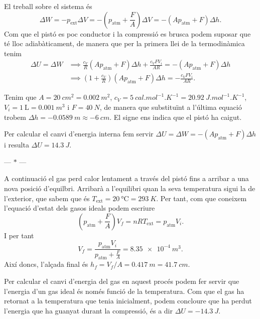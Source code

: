 \documentclass[12pt]{article}
\newcommand{\parbreak}{
	\begin{center}
		--- $\ast$ ---
	\end{center} 
}
\begin{document}
El treball sobre el sistema és
\begin{equation*}
	\Delta W = - p_{\text{ext}} \Delta V = -\left(p_{\text{atm}} + \frac{F}{A}\right) \Delta V = -(Ap_{\text{atm}} + F) \Delta h.
\end{equation*}
Com que el pistó es poc conductor i la compressió es brusca podem suposar que té lloc adiabàticament, de manera que per la primera llei de la termodinàmica tenim
\begin{align*}
	\Delta U = \Delta W & \implies \frac{c_V}{R} (A p_{\text{atm}} + F) \Delta h + \frac{c_V F V_i}{AR} = -(Ap_{\text{atm}} + F) \Delta h \\
											& \implies \left(1 + \frac{c_V}{R}\right) \left(A p_{\text{atm}} + F \right) \Delta h = -\frac{c_V F V_i}{AR}. 
\end{align*}

Tenim que \( A = \SI{20}{cm^2} = \SI{0.002}{m^2} \), \( c_V = \SI{5}{cal.mol^{-1}.K^{-1}} = \SI{20.92}{J.mol^{-1}.K^{-1}} \), \( V_i = \SI{1}{\liter} = \SI{0.001}{m^3} \) i \( F = \SI{40}{N} \), de manera que substituïnt a l'última equació trobem \( \Delta h = \SI{-0.0589}{m} \approx \SI{-6}{cm} \). El signe ens indica que el pistó ha caigut. 

Per calcular el canvi d'energia interna fem servir \( \Delta U = \Delta W = -(Ap_{\text{atm}} + F) \Delta h \) i resulta \( \Delta U = \SI{14.3}{J} \).

\parbreak

A continuació el gas perd calor lentament a través del pistó fins a arribar a una nova posició d'equilbri. Arribarà a l'equilibri quan la seva temperatura sigui la de l'exterior, que sabem que és \( T_{\text{ext}} = \SI{20}{\celsius} = \SI{293}{K} \). Per tant, com que coneixem l'equació d'estat dels gasos ideals podem escriure
\begin{equation*}
	\left(p_{\text{atm}} + \frac{F}{A}\right) V_f = nRT_{\text{ext}} = p_{\text{atm}}V_i.
\end{equation*}
I per tant
\begin{equation*}
	V_f = \frac{p_{\text{atm}}V_i}{p_{\text{atm}} + \frac{F}{A}} = \SI{8.35e-4}{m^3}.
\end{equation*}
Així doncs, l'alçada final és \( h_f = V_f / A = \SI{0.417}{m} = \SI{41.7}{cm} \). 

Per calcular el canvi d'energia del gas en aquest procés podem fer servir que l'energia d'un gas ideal és només funció de la temperatura. Com que el gas ha retornat a la temperatura que tenia inicialment, podem concloure que ha perdut l'energia que ha guanyat durant la compressió, és a dir \( \Delta U = \SI{-14.3}{J} \). 
\end{document}
